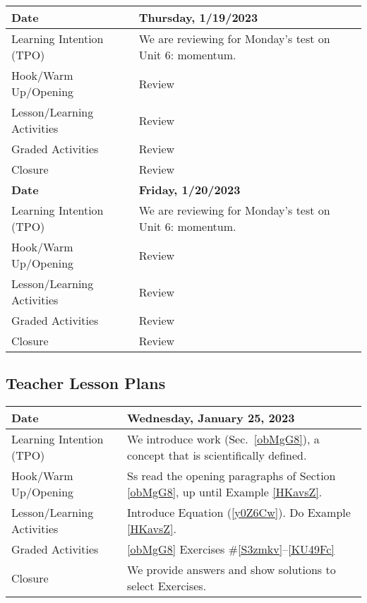 \documentclass[main.tex]{subfiles}
\begin{document}
\begin{tabular}{|m{}|m{}|}
    \cellcolor{black!20}\textbf{Date} & \cellcolor{black!20}\textbf{Thursday, 1/19/2023} \\
    \hline
    Learning Intention (TPO) & We are reviewing for Monday's test on Unit 6: momentum.\\
    \hline
    Hook/Warm Up/Opening & Review\\
    \hline
    Lesson/Learning Activities & Review\\
    \hline
    Graded Activities & Review\\
    \hline
    Closure & Review\\
    \hline
    \hline

    \cellcolor{black!20}\textbf{Date} & \cellcolor{black!20}\textbf{Friday, 1/20/2023} \\
    \hline
    Learning Intention (TPO) & We are reviewing for Monday's test on Unit 6: momentum.\\
    \hline
    Hook/Warm Up/Opening & Review\\
    \hline
    Lesson/Learning Activities & Review\\
    \hline
    Graded Activities & Review\\
    \hline
    Closure & Review\\
    \hline
    \hline
\end{tabular}

\clearpage

\subsection{Teacher Lesson Plans}

\begin{tabular}{|m{}|m{}|}
    \hline  
    \cellcolor{black!20}\textbf{Date} &
    \cellcolor{black!20}\textbf{Wednesday, January 25, 2023} \\
    \hline
    Learning Intention (TPO) & We introduce \gls{work} (Sec.~\ref{obMgG8}), a concept that is scientifically defined.\\
    \hline
    Hook/Warm Up/Opening & Ss read the opening paragraphs of Section \ref{obMgG8}, up until Example \ref{HKavsZ}.\\
    \hline
    Lesson/Learning Activities &  Introduce Equation (\ref{y0Z6Cw}). Do Example \ref{HKavsZ}.  \\
    \hline
    Graded Activities & \ref{obMgG8} Exercises \#\ref{S3zmkv}--\ref{KU49Fc} \\
    \hline
    Closure & We provide answers and show solutions to select Exercises.\\   
    \hline
\end{tabular}
\end{document}
